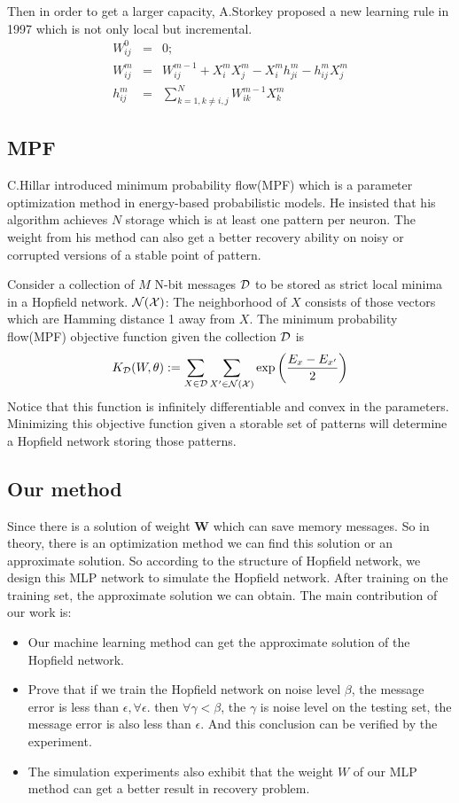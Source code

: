 Then in order to get a larger capacity, A.Storkey proposed a new learning rule in 1997 which is not only local but incremental.
    \begin{eqnarray*}
     W_{ij}^0 &=& 0; \\
     W_{ij}^m &=& W_{ij}^{m - 1} + X_i^mX_j^m - X_i^mh_{ji}^m - h_{ij}^mX_j^m \\
     h_{ij}^m &=& \sum_{k=1,k\neq i,j}^N W_{ik}^{m-1}X_k^m
    \end{eqnarray*}

\subsection{MPF}
C.Hillar introduced minimum probability flow(MPF) which is a parameter optimization method in energy-based probabilistic models. 
He insisted that his algorithm achieves $N$ storage which is at least one pattern per neuron. 
The weight from his method can also get a better recovery ability on noisy or corrupted versions of a stable point of pattern.

Consider a collection of $M$ N-bit messages $\cal{D}$ to be stored as strict local minima in a Hopfield network. $\cal{N}(X)$: The neighborhood of $X$ consists of those vectors which are Hamming distance 1 away from $X$. 
The minimum probability flow(MPF) objective function given the collection $\cal{D}$ is
    \begin{eqnarray*}
      K_{\cal{D}}(W, \theta) := \sum_{X \in \cal{D}} \sum_{X' \in \cal{N}(X)} \exp \left(\frac{E_x - E_{x'}}{2}\right)
    \end{eqnarray*}
Notice that this function is infinitely differentiable and convex in the parameters.
Minimizing this objective function given a storable set of patterns will determine a Hopfield network storing those patterns.

\subsection{Our method}
Since there is a solution of weight $\textbf{W}$ which can save memory messages. 
So in theory, there is an optimization method we can find this solution or an approximate solution. 
So according to the structure of Hopfield network, we design this MLP network to simulate the Hopfield network. 
After training on the training set, the approximate solution we can obtain. 
The main contribution of our work is:
\begin{itemize}
  \item Our machine learning method can get the approximate solution of the Hopfield network.
  \item Prove that if we train the Hopfield network on noise level $\beta$, the message error is less than $\epsilon, \forall \epsilon$. 
      then $\forall \gamma < \beta$, the $\gamma$ is noise level on the testing set, the message error is also less than $\epsilon$.
      And this conclusion can be verified by the experiment.
  \item The simulation experiments also exhibit that the weight $W$ of our MLP method can get a better result in recovery problem.
\end{itemize}
